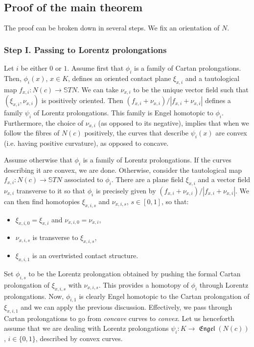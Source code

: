 \documentclass[10pt]{amsart}
\newcommand{\Engel}{\operatorname{\mathfrak{Engel}}}
\theoremstyle{definition}
\begin{document}
\subsection{Proof of the main theorem} \label{ssec:proofMain}

The proof can be broken down in several steps. We fix an orientation of $N$.

\subsubsection{Step I. Passing to Lorentz prolongations} \label{sssec:stepI}

Let $i$ be either $0$ or $1$. Assume first that $\phi_i$ is a family of Cartan prolongations. Then, $\phi_i(x)$, $x \in K$, defines an oriented contact plane $\xi_{x,i}$ and a tautological map $f_{x,i}: N(c) \to \mathbb{S}TN$. We can take $\nu_{x,i}$ to be the unique vector field such that $(\xi_{x,i},\nu_{x,i})$ is positively oriented. Then $(f_{x,i} + \nu_{x,i})/|f_{x,i} + \nu_{x,i}|$ defines a family $\psi_i$ of Lorentz prolongations. This family is Engel homotopic to $\phi_i$. Furthermore, the choice of $\nu_{x,i}$ (as opposed to its negative), implies that when we follow the fibres of $N(c)$ positively, the curves that describe $\psi_i(x)$ are convex (i.e. having positive curvature), as opposed to concave.

Assume otherwise that $\phi_i$ is a family of Lorentz prolongations. If the curves describing it are convex, we are done. Otherwise, consider the tautological map $f_{x,i}: N(c) \to \mathbb{S}TN$ associated to $\phi_i$. There are a plane field $\xi_{x,i}$ and a vector field $\nu_{x,i}$ transverse to it so that $\phi_i$ is precisely given by $(f_{x,i} + \nu_{x,i})/|f_{x,i} + \nu_{x,i}|$. We can then find homotopies $\xi_{x,i,s}$ and $\nu_{x,i,s}$, $s \in [0,1]$, so that:
\begin{itemize}
\item $\xi_{x,i,0} = \xi_{x,i}$ and $\nu_{x,i,0} = \nu_{x,i}$, 
\item $\nu_{x,i,s}$ is transverse to $\xi_{x,i,s}$,
\item $\xi_{x,i,1}$ is an overtwisted contact structure.
\end{itemize}
Set $\phi_{i,s}$ to be the Lorentz prolongation obtained by pushing the formal Cartan prolongation of $\xi_{x,i,s}$ with $\nu_{x,i,s}$. This provides a homotopy of $\phi_i$ through Lorentz prolongations. Now, $\phi_{i,1}$ is clearly Engel homotopic to the Cartan prolongation of $\xi_{x,i,1}$ and we can apply the previous discussion. Effectively, we pass through Cartan prolongations to go from \emph{concave} curves to \emph{convex}. Let us henceforth assume that we are dealing with Lorentz prolongations $\psi_i: K \to \Engel(N(c))$, $i \in \{0,1\}$, described by convex curves.
\end{document}
